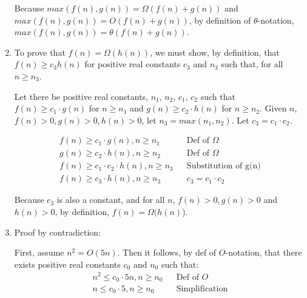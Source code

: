 \documentclass[a4paper]{report}
\begin{document}
\begin{enumerate}
    Because $max(f(n), g(n)) = \Omega(f(n) + g(n))$ and $max(f(n), g(n)) = O(f(n) + g(n))$, by definition of $\theta$-notation, $max(f(n), g(n)) = \theta(f(n) + g(n))$.

    \par
    \bigskip

    \item To prove that $f(n) = \Omega(h(n))$, we must show, by definition, that $f(n) \geq c_{3} h(n)$ for positive real constants $c_{3}$ and $n_{3}$ such that, for all $n \geq n_{3}$.

    Let there be positive real constants, $n_{1}$, $n_{2}$, $c_{1}$, $c_{2}$ such that $f(n) \geq c_{1} \cdot g(n)$ for $n \geq n_{1}$ and $g(n) \geq c_{2} \cdot h(n)$ for $n \geq n_{2}$.
    Given $n$, $f(n) > 0, g(n) > 0, h(n) > 0$, let $n_{3} = max(n_{1}, n_{2})$. Let $c_{3} = c_{1} \cdot c_{2}$.

    \setcounter{equation}{0}
    \begin{align}
      f(n) \geq c_{1} \cdot g(n), n \geq n_{1}             &&\text{Def of $\Omega$}\\
      g(n) \geq c_{2} \cdot h(n), n \geq n_{2}             &&\text{Def of $\Omega$}\\
      f(n) \geq c_{1} \cdot c_{2} \cdot h(n), n \geq n_{3} &&\text{Substitution of g(n)}\\
      f(n) \geq c_{3} \cdot h(n), n \geq n_{3}             &&\text{$c_{3} = c_{1} \cdot c_{2}$}
    \end{align}

    Because $c_{3}$ is also a constant, and for all $n$, $f(n) > 0, g(n) > 0$ and $h(n) > 0$, by definition,
    $f(n) = \Omega(h(n)$).

    \par
    \bigskip
    \setcounter{equation}{0}

    \item Proof by contradiction: 

    First, assume $n^2 = O(5n)$. Then it follows, by def of $O$-notation, that there exists positive real constants $c_{0}$ and $n_{0}$ such that:
    \begin{align}
      n^2 \leq c_{0} \cdot 5n, n \geq n_{0}               &&\text{Def of $O$}\\
      n \leq c_{0} \cdot 5, n \geq n_{0}                  &&\text{Simplification}
    \end{align}


\end{enumerate}
\end{document}
